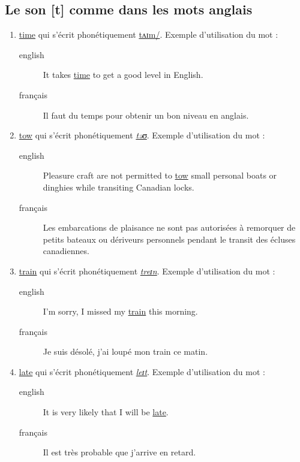 \subsection{Le son [t] comme dans les mots anglais}
\label{sec:org461eecd}
\begin{enumerate}
\item \href{http://www.wordreference.com/enfr/time}{time} qui s'écrit phonétiquement \href{https://en.oxforddictionaries.com/definition/time}{tʌɪm/}. Exemple d'utilisation du mot :
\begin{description}
\item[{english}] \textenglish{It takes \href{https://youtu.be/A7pI96Osp9c}{time} to get a good level in English.}
\item[{français}] Il faut du temps pour obtenir un bon niveau en anglais.
\end{description}
\item \href{http://www.wordreference.com/enfr/tow}{tow} qui s'écrit phonétiquement \href{https://en.oxforddictionaries.com/definition/tow}{\emph{təʊ}}. Exemple d'utilisation du mot :
\begin{description}
\item[{english}] \textenglish{Pleasure craft are not permitted to \href{https://youtu.be/tGIx9uoJh9M}{tow} small personal
boats or dinghies while transiting Canadian locks.}
\item[{français}] Les embarcations de plaisance ne sont pas autorisées
à remorquer de petits bateaux ou dériveurs personnels pendant
le transit des écluses canadiennes.
\end{description}
\item \href{http://www.wordreference.com/enfr/train}{train} qui s'écrit phonétiquement \href{https://en.oxforddictionaries.com/definition/train}{\emph{treɪn}}. Exemple d'utilisation du mot :
\begin{description}
\item[{english}] \textenglish{I'm sorry, I missed my \href{https://youtu.be/jgxKrH-O2Kk}{train} this morning.}
\item[{français}] Je suis désolé, j'ai loupé mon train ce matin.
\end{description}
\item \href{http://www.wordreference.com/enfr/late}{late} qui s'écrit phonétiquement \href{https://en.oxforddictionaries.com/definition/late}{\emph{leɪt}}. Exemple d'utilisation du mot : 
\begin{description}
\item[{english}] \textenglish{It is very likely that I will be \href{https://youtu.be/v\_HNcDj7-Kw}{late}.}
\item[{français}] Il est très probable que j'arrive en retard.
\end{description}
\end{enumerate}
